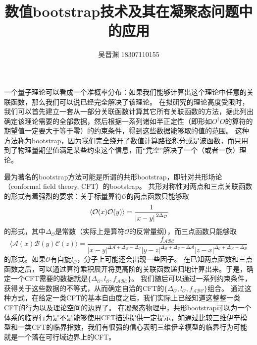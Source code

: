 \documentclass[hyperref, UTF8, a4paper]{ctexart}
\title{数值bootstrap技术及其在凝聚态问题中的应用}
\author{吴晋渊 18307110155}
\date{}
\begin{document}
\maketitle

一个量子理论可以看成一个准概率分布：如果我们能够计算出这个理论中任意的关联函数，那么我们可以说已经完全解决了该理论。
在拟研究的理论高度受限时，我们可以首先建立一套从一部分关联函数计算其它所有关联函数的方法，据此列出确定该理论需要的全部数据，然后根据一系列诸如半正定性（即形如$O^\dagger O$的算符的期望值一定要大于等于零）的约束条件，得到这些数据能够取的值的范围。
这种方法称为bootstrap，因为我们完全绕开了数值计算路径积分或是波函数，而只用到了物理量期望值满足某些约束这个信息，而“凭空”解决了一个（或者一族）理论\cite{bhattacharya2021}。

最为著名的bootstrap方法可能是所谓的共形bootstrap，即针对共形场论（conformal field theory, CFT）的bootstrap。
共形对称性对两点和三点关联函数的形式有着强烈的要求：关于标量算符$\mathcal{O}$的两点函数只能够取
\begin{equation}
    \expval*{\mathcal{O}(x) \mathcal{O}(y)} = \frac{1}{\abs*{x - y}^{2 \Delta_\mathcal{O}}}
    \label{eq:two-point-conformal}
\end{equation}
的形式，其中$\Delta_{\mathcal{O}}$是常数（实际上是算符$\mathcal{O}$的反常量纲），而三点函数只能够取
\begin{equation}
    \langle\mathcal{A}(x) \mathcal{B}(y) \mathcal{C}(z)\rangle = \frac{f_{\mathcal{A B C}}}{|x-y|^{\Delta \mathcal{A}+\Delta_{\mathcal{B}}-\Delta_{\mathcal{C}}}|y-z|^{\Delta_{\mathcal{B}}+\Delta_{\mathcal{C}}-\Delta \mathcal{A}}|z-x|^{\Delta_{\mathcal{C}}+\Delta_{\mathcal{A}}-\Delta_{\mathcal{B}}}}
    \label{eq:three-point-conformal}
\end{equation}
的形式。如果$\mathcal{O}$有自旋$l_{\mathcal{O}}$，分子上可能还会出现一些因子。
在已知两点函数和三点函数之后，可以通过算符乘积展开将更高阶的关联函数递归地计算出来。于是，确定一个CFT需要的数据就是$\{\Delta_{\mathcal{O}}, l_{\mathcal{O}}, f_{\mathcal{A} \mathcal{B} \mathcal{C}}\}$。
我们随后可以通过一系列约束条件，获得关于这些数据的不等式，从而确定自洽的CFT的$\{\Delta_{\mathcal{O}}, l_{\mathcal{O}}, f_{\mathcal{A} \mathcal{B} \mathcal{C}}\}$组合。
通过这种方式，在给定一类CFT的基本自由度之后，我们实际上已经知道这整整一类CFT的行为以及理论空间的边界了\cite{Poland_2016,2019}。
在凝聚态物理中，共形bootstrap可以为一个体系的临界行为是不是能够使用CFT描述提供一定提示，如通过比较三维伊辛模型和一类CFT的临界指数，我们有很强的信心表明三维伊辛模型的临界行为可能就是一个落在可行域边界上的CFT\cite{prd2012ising,Poland_2016}。
\end{document}
